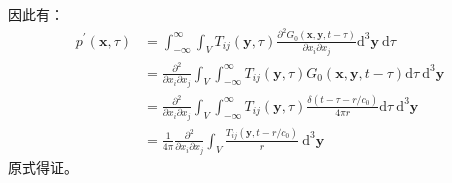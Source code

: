 \begin{enumerate}
\begin{equation}
    \end{equation}
    因此有：
    \begin{equation}
        \begin{aligned}
            p^{\prime}(\mathbf{x},\tau) 
            &= \int_{-\infty}^{\infty} \int_{V} T_{i j}(\mathbf{y},\tau) \frac{\partial^{2} G_{0}(\mathbf{x},\mathbf{y},t-\tau)}{\partial x_{i} \partial x_{j}} \mathrm{d}^{3} \mathbf{y} \mathrm{~d} \tau \\
            &= \frac{\partial^{2}}{\partial x_{i} \partial x_{j}} \int_{V} \int_{-\infty}^{\infty} T_{i j}(\mathbf{y},\tau)  G_{0}(\mathbf{x},\mathbf{y},t-\tau) \mathrm{d} \tau \mathrm{~d}^{3} \mathbf{y} \\
            &= \frac{\partial^{2}}{\partial x_{i} \partial x_{j}} \int_{V} \int_{-\infty}^{\infty} T_{i j}(\mathbf{y},\tau)  \frac{\delta(t - \tau - r/c_{0})}{4 \pi r} \mathrm{d} \tau \mathrm{~d}^{3} \mathbf{y} \\
            &= \frac{1}{4 \pi} \frac{\partial^{2}}{\partial x_{i} \partial x_{j}} \int_{V} \frac{T_{i j}\left(\mathbf{y}, t-r / c_{0}\right)}{r} \mathrm{~d}^{3} \mathbf{y}
        \end{aligned}
    \end{equation}
    原式得证。
\end{enumerate}